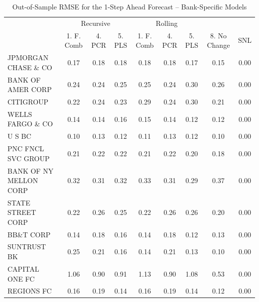 \documentclass[11pt]{article}
\begin{document}
\begin{table}  
\caption{Out-of-Sample RMSE for the 1-Step Ahead Forecast -- Bank-Specific Models} 
\center                                                        
\begin{tabular}{|l|c|c|c|c|c|c|c|c|}                                                                      
\hline 
&\multicolumn{3}{|c|}{Recursive}&\multicolumn{3}{|c|}{Rolling}    & & \\                                                                                               
                                                                                                   
&1. F. Comb  &4. PCR      &5. PLS      &1. F. Comb  &4. PCR      &5. PLS      &8. No Change&SNL         \\
\hline                                                                                                    
JPMORGAN CHASE \& CO  &0.17&0.18&0.18&0.18&0.18&0.17&0.15&0.00\\                                          
BANK OF AMER CORP     &0.24&0.24&0.25&0.25&0.24&0.30&0.26&0.00\\                                          
CITIGROUP             &0.22&0.24&0.23&0.29&0.24&0.30&0.21&0.00\\                                          
WELLS FARGO \& CO     &0.14&0.14&0.16&0.15&0.14&0.12&0.12&0.00\\                                          
U S BC                &0.10&0.13&0.12&0.11&0.13&0.12&0.10&0.00\\                                          
PNC FNCL SVC GROUP    &0.21&0.22&0.22&0.21&0.22&0.20&0.18&0.00\\                                          
BANK OF NY MELLON CORP&0.32&0.31&0.32&0.33&0.31&0.29&0.37&0.00\\                                          
STATE STREET CORP     &0.22&0.26&0.25&0.22&0.26&0.26&0.20&0.00\\                                          
BB\&T CORP            &0.14&0.18&0.16&0.14&0.18&0.12&0.13&0.00\\                                          
SUNTRUST BK           &0.25&0.21&0.16&0.14&0.21&0.13&0.10&0.00\\                                          
CAPITAL ONE FC        &1.06&0.90&0.91&1.13&0.90&1.08&0.53&0.00\\                                          
REGIONS FC            &0.16&0.19&0.14&0.16&0.19&0.14&0.12&0.00\\                                          

\end{tabular}
\end{table}
\end{document}

